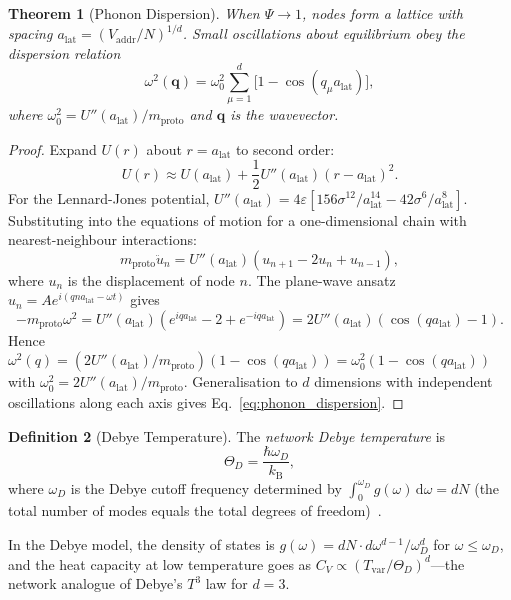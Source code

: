 \documentclass[11pt,twocolumn,a4paper]{article}
\newtheorem{theorem}{Theorem}[section]
\theoremstyle{definition}
\newtheorem{definition}[theorem]{Definition}
\theoremstyle{remark}
\newcommand{\kB}{k_{\mathrm{B}}}
\newcommand{\Tvar}{T_{\mathrm{var}}}
\newcommand{\Vaddr}{V_{\mathrm{addr}}}
\newcommand{\mpr}{m_{\mathrm{proto}}}
\newcommand{\dd}{\mathrm{d}}
\begin{document}
\begin{theorem}[Phonon Dispersion]\label{thm:phonon}
When $\Psi\to 1$, nodes form a lattice with spacing
$a_{\mathrm{lat}}=(\Vaddr/N)^{1/d}$.  Small oscillations about equilibrium
obey the dispersion relation
\begin{equation}\label{eq:phonon_dispersion}
  \omega^2(\bm{q}) = \omega_0^2\sum_{\mu=1}^{d}
  \bigl[1-\cos(q_\mu a_{\mathrm{lat}})\bigr],
\end{equation}
where $\omega_0^2=U''(a_{\mathrm{lat}})/\mpr$ and $\bm{q}$ is the wavevector.
\end{theorem}

\begin{proof}
Expand $U(r)$ about $r=a_{\mathrm{lat}}$ to second order:
\[
  U(r)\approx U(a_{\mathrm{lat}})+\frac{1}{2}U''(a_{\mathrm{lat}})
  (r-a_{\mathrm{lat}})^2.
\]
For the Lennard-Jones potential,
$U''(a_{\mathrm{lat}})=4\varepsilon[156\sigma^{12}/a_{\mathrm{lat}}^{14}
-42\sigma^6/a_{\mathrm{lat}}^8]$.
Substituting into the equations of motion for a one-dimensional chain with
nearest-neighbour interactions:
\[
  \mpr\ddot{u}_n = U''(a_{\mathrm{lat}})(u_{n+1}-2u_n+u_{n-1}),
\]
where $u_n$ is the displacement of node $n$.  The plane-wave ansatz
$u_n=A e^{i(qna_{\mathrm{lat}}-\omega t)}$ gives
\[
  -\mpr\omega^2 = U''(a_{\mathrm{lat}})(e^{iqa_{\mathrm{lat}}}
  -2+e^{-iqa_{\mathrm{lat}}})
  = 2U''(a_{\mathrm{lat}})(\cos(qa_{\mathrm{lat}})-1).
\]
Hence $\omega^2(q)=(2U''(a_{\mathrm{lat}})/\mpr)(1-\cos(qa_{\mathrm{lat}}))
=\omega_0^2(1-\cos(qa_{\mathrm{lat}}))$ with
$\omega_0^2=2U''(a_{\mathrm{lat}})/\mpr$.
Generalisation to $d$ dimensions with independent oscillations along each
axis gives Eq.~\eqref{eq:phonon_dispersion}.
\end{proof}

\begin{definition}[Debye Temperature]\label{def:debye}
The \emph{network Debye temperature} is
\begin{equation}\label{eq:debye_temp}
  \Theta_D = \frac{\hbar\omega_D}{\kB},
\end{equation}
where $\omega_D$ is the Debye cutoff frequency determined by
$\int_0^{\omega_D}g(\omega)\,\dd\omega=dN$ (the total number of modes
equals the total degrees of freedom)~\cite{Debye1912}.
\end{definition}

In the Debye model, the density of states is
$g(\omega)=dN\cdot d\omega^{d-1}/\omega_D^d$ for $\omega\leq\omega_D$,
and the heat capacity at low temperature goes as
$C_V\propto(\Tvar/\Theta_D)^d$---the network analogue of Debye's $T^3$ law
for $d=3$.
\end{document}
